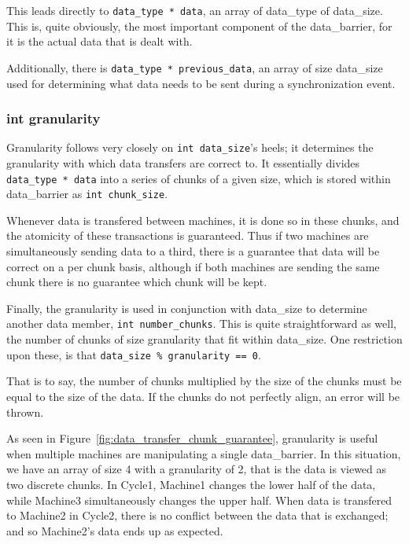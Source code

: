\documentclass[../thesis.tex]{subfiles}
\begin{document}
      This leads directly to \texttt{data\_type * data}, an array of data\_type of data\_size. This is, quite obviously, the most important component of the data\_barrier, for it is the actual data that is dealt with.

      Additionally, there is \texttt{data\_type * previous\_data}, an array of size data\_size used for determining what data needs to be sent during a synchronization event.

  \subsubsection{int granularity} %
  \label{ssub:int_granularity}
    Granularity follows very closely on \texttt{int data\_size}'s heels; it determines the granularity with which data transfers are correct to. It essentially divides \texttt{data\_type * data} into a series of chunks of a given size, which is stored within data\_barrier as \texttt{int chunk\_size}.

    Whenever data is transfered between machines, it is done so in these chunks, and the atomicity of these transactions is guaranteed. Thus if two machines are simultaneously sending data to a third, there is a guarantee that data will be correct on a per chunk basis, although if both machines are sending the same chunk there is no guarantee which chunk will be kept.

    Finally, the granularity is used in conjunction with data\_size to determine another data member, \texttt{int number\_chunks}. This is quite straightforward as well, the number of chunks of size granularity that fit within data\_size. One restriction upon these, is that \texttt{data\_size \% granularity == 0}.

    That is to say, the number of chunks multiplied by the size of the chunks must be equal to the size of the data. If the chunks do not perfectly align, an error will be thrown.
 
    As seen in Figure~\ref{fig:data_transfer_chunk_guarantee}, granularity is useful when multiple machines are manipulating a single data\_barrier. In this situation, we have an array of size 4 with a granularity of 2, that is the data is viewed as two discrete chunks. In Cycle1, Machine1 changes the lower half of the data, while Machine3 simultaneously changes the upper half. When data is transfered to Machine2 in Cycle2, there is no conflict between the data that is exchanged; and so Machine2's data ends up as expected.
\end{document}
